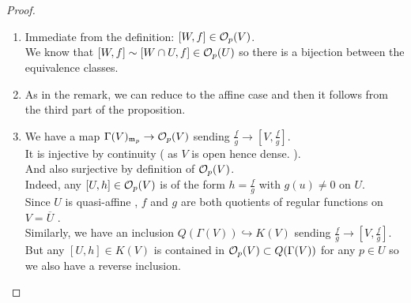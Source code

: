 \documentclass[../main.tex]{subfiles}
\begin{document}
\begin{proof}
\begin{enumerate}
\item Immediate from the definition: $ [ W,f] \in \mathcal{O}_p( V)  $.\\
We know that $ [ W,f] \sim [ W\cap U, f] \in \mathcal{O}_p( U)  $ so there is a bijection between the equivalence classes.\item As in the remark, we can reduce to the affine case and then it follows from the third part of the proposition.
\item We have a map $\Gamma( V)_{\mathfrak{m}_p}  \to \mathcal{O}_p( V) $ sending $\frac{f}{g}\to [ V, \frac{f}{g}] $.\\
	It is injective by continuity ( as $V$ is open hence dense. ).\\
	And also surjective by definition of $\mathcal{O}_p( V) $.\\
	Indeed, any $ [ U,h] \in \mathcal{O}_p( V) $ is of the form $h = \frac{f}{g}$ with $g( u) \neq 0$ on $U$.\\
	Since $U$ is quasi-affine , $f$ and $g$ are both quotients of regular functions  on $ V = \overline{U} $ .\\
	Similarly, we have an inclusion $ Q( \Gamma( V) ) \hookrightarrow K( V) $ sending $ \frac{f}{g}\to   [ V, \frac{f}{g}] $.\\
	But any $ [ U, h] \in K( V) $ is contained in $\mathcal{O}_p( V) \subset Q( \Gamma( V) )  $ for any $p\in U$ so we also have a reverse inclusion.
\end{enumerate}

\end{proof}
\end{document}
